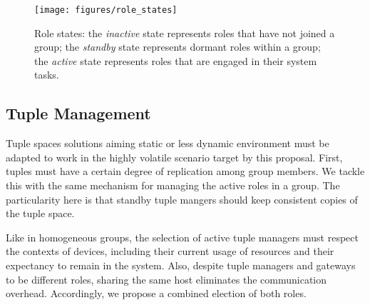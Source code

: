 \begin{figure}[t!]
	\centering
	\texttt{[image: figures/role\_states]}
	\caption{Role states: the \textit{inactive} state represents roles that have not joined a group; the \textit{standby} state represents dormant roles within a group; the \textit{active} state represents roles that are engaged in their system tasks.}
	\label{fig:role_states}
\end{figure}

\subsection{Tuple Management}

Tuple spaces solutions aiming static or less dynamic environment must be adapted to work in the highly volatile scenario target by this proposal. First, tuples must have a certain degree of replication among group members. We tackle this with the same mechanism for managing the active roles in a group. The particularity here is that standby tuple mangers should keep consistent copies of the tuple space.

Like in homogeneous groups, the selection of active tuple managers must respect the contexts of devices, including their current usage of resources and their expectancy to remain in the system. Also, despite tuple managers and gateways to be different roles, sharing the same host eliminates the communication overhead. Accordingly, we propose a combined election of both roles.



